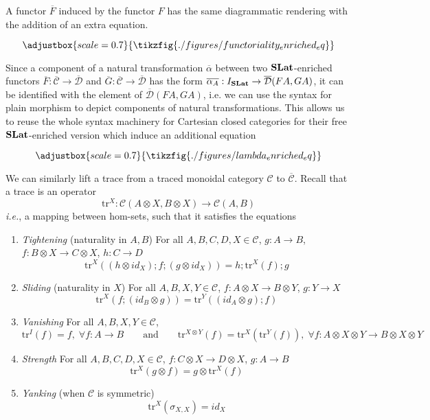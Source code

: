 \documentclass[acmsmall, screen, nonacm]{acmart}
\newcommand\enriched[1]{{\overline{\mathcal{#1}}}}
\begin{document}
A functor $\overline{F}$ induced by the functor $F$ has the same diagrammatic rendering with the addition of an extra equation.

\[
\adjustbox{scale=0.7}{
\tikzfig{./figures/functoriality_enriched_eq}
}
\]

Since a component of a natural transformation $\overline{\alpha}$ between two $\mathbf{SLat}$-enriched functors $\overline{F} : \enriched{C} \to \enriched{D}$ and $\overline{G}: \enriched{C} \to \enriched{D}$ has the form $\overline{\alpha_{A}} : I_{\catname{SLat}} \to \enriched{D}(FA, GA)$, it can be identified with the element of $\enriched{D}(FA,GA)$, i.e. we can use the syntax for plain morphism to depict components of natural transformations.
This allows us to reuse the whole syntax machinery for Cartesian closed categories for their free $\mathbf{SLat}$-enriched version which induce an additional equation 

\[
\adjustbox{scale=0.7}{
  \tikzfig{./figures/lambda_enriched_eq}
}
\]

We can similarly lift a trace from a traced monoidal category $\mathcal{C}$ to $\enriched{C}$.
Recall that a trace is an operator
\[
\text{tr}^{X} : \mathcal{C}(A \otimes X, B \otimes X) \to \mathcal{C}(A,B)
\]
\textit{i.e.}, a mapping between hom-sets, such that it satisfies the equations
\begin{enumerate}
  \item \textit{Tightening} (naturality in $A,B$) For all $A, B, C, D, X \in \mathcal{C}$, $g : A \to B$, $f : B \otimes X \to C \otimes X$, $h : C \to D$
  \[
  \text{tr}^{X}((h \otimes id_{X});f;(g \otimes id_{X})) = h;\text{tr}^{X}(f);g
  \]
  \item \textit{Sliding} (naturality in $X$) For all $A,B,X,Y \in \mathcal{C}$, $f : A \otimes X \to B \otimes Y$, $g : Y \to X$
  \[
   \text{tr}^{X}(f;(id_{B} \otimes g)) = \text{tr}^{Y}((id_{A} \otimes g); f) 
  \]
  \item \textit{Vanishing} For all $A,B,X,Y \in \mathcal{C}$,
  \[
  \text{tr}^{I}(f) = f,\; \forall f : A \to B \qquad \text{and} \qquad \text{tr}^{X \otimes Y}(f) = \text{tr}^{X}(\text{tr}^{Y}(f)), \; \forall f : A \otimes X \otimes Y \to B \otimes X \otimes Y
  \]
  \item \textit{Strength} For all $A,B,C,D,X \in \mathcal{C}$, $f : C \otimes X \to D \otimes X$, $g : A \to B$
    \[
    \text{tr}^{X}(g \otimes f) = g \otimes \text{tr}^{X}(f)
    \] 
  \item \textit{Yanking} (when $\mathcal{C}$ is symmetric)
    \[
    \text{tr}^{X}(\sigma_{X,X}) = id_{X}
    \]
\end{enumerate}
\end{document}
